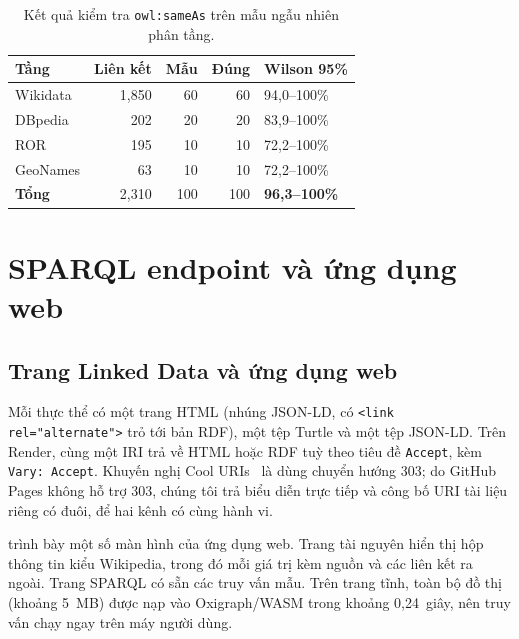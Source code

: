\documentclass[12pt,a4paper]{article}
\begin{document}
\begin{table}[htbp]
\centering\small
\caption{Kết quả kiểm tra \texttt{owl:sameAs} trên mẫu ngẫu nhiên phân tầng.}\label{tab:precision}
\begin{tabular}{lrrrl}
\toprule
Tầng & Liên kết & Mẫu & Đúng & Wilson 95\% \\
\midrule
Wikidata & 1{,}850 & 60 & 60 & 94,0--100\% \\
DBpedia & 202 & 20 & 20 & 83,9--100\% \\
ROR & 195 & 10 & 10 & 72,2--100\% \\
GeoNames & 63 & 10 & 10 & 72,2--100\% \\
\midrule
\textbf{Tổng} & 2{,}310 & 100 & 100 & \textbf{96,3--100\%} \\
\bottomrule
\end{tabular}
\end{table}

\section{SPARQL endpoint và ứng dụng web}\label{sec:publish}

\subsection{Trang Linked Data và ứng dụng web}
Mỗi thực thể có một trang HTML (nhúng JSON-LD, có \texttt{<link rel="alternate">} trỏ tới bản RDF), một tệp Turtle và
một tệp JSON-LD. Trên Render, cùng một IRI trả về HTML hoặc RDF tuỳ theo tiêu đề \texttt{Accept}, kèm
\texttt{Vary: Accept}. Khuyến nghị Cool URIs~\cite{w3c2008cooluris} là dùng chuyển hướng 303; do GitHub Pages không hỗ
trợ 303, chúng tôi trả biểu diễn trực tiếp và công bố URI tài liệu riêng có đuôi, để hai kênh có cùng hành vi.

 trình bày một số màn hình của ứng dụng web. Trang tài nguyên hiển thị hộp thông tin kiểu Wikipedia, trong
đó mỗi giá trị kèm nguồn và các liên kết ra ngoài. Trang SPARQL có sẵn các truy vấn mẫu. Trên trang tĩnh, toàn bộ đồ thị
(khoảng 5~MB) được nạp vào Oxigraph/WASM trong khoảng 0,24~giây, nên truy vấn chạy ngay trên máy người dùng.
\end{document}
